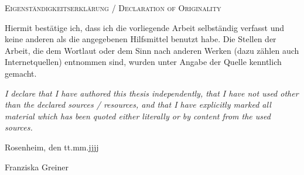 \cleardoubleemptypage

{
\large
\thispagestyle{empty}
\vspace*{\fill}

\noindent
\textsc{Eigenständigkeitserklärung / Declaration of Originality}

\medskip

\noindent
Hiermit bestätige ich, dass ich die vorliegende Arbeit selbständig verfasst und keine anderen als die angegebenen Hilfsmittel benutzt habe. Die Stellen der Arbeit, die dem Wortlaut oder dem Sinn nach anderen Werken (dazu zählen auch Internetquellen) entnommen sind, wurden unter Angabe der Quelle kenntlich gemacht.

\medskip

\textit{I declare that I have authored this thesis independently, that I have not used other than the declared sources / resources, and that I have explicitly marked all material which has been quoted either literally or by content from the used sources.}

\bigskip

\noindent
Rosenheim, den tt.mm.jjjj

\vspace*{2cm}

\noindent
Franziska Greiner
}

